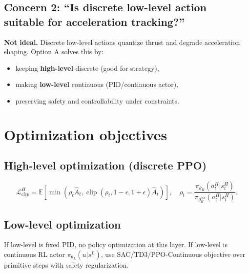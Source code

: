 \documentclass[11pt]{article}
\begin{document}
\subsection{Concern 2: ``Is discrete low-level action suitable for acceleration tracking?''}
\textbf{Not ideal.} Discrete low-level actions quantize thrust and degrade acceleration shaping. Option A solves this by:
\begin{itemize}
  \item keeping \textbf{high-level} discrete (good for strategy),
  \item making \textbf{low-level} continuous (PID/continuous actor),
  \item preserving safety and controllability under constraints.
\end{itemize}

\section{Optimization objectives}

\subsection{High-level optimization (discrete PPO)}
\begin{equation}
\mathcal{L}_{clip}^H=\mathbb{E}\left[\min\left(\rho_t\hat A_t,
\operatorname{clip}(\rho_t,1-\epsilon,1+\epsilon)\hat A_t\right)\right],
\quad
\rho_t=\frac{\pi_{\theta_H}(a_t^H|s_t^H)}{\pi_{\theta_H^{old}}(a_t^H|s_t^H)}.
\end{equation}

\subsection{Low-level optimization}
If low-level is fixed PID, no policy optimization at this layer.
If low-level is continuous RL actor \(\pi_{\theta_L}(u|s^L)\), use SAC/TD3/PPO-Continuous objective over primitive steps with safety regularization.
\end{document}
